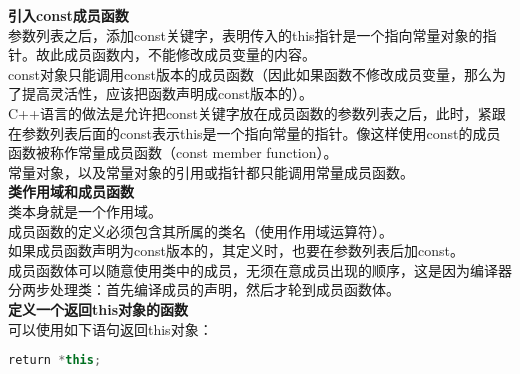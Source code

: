 \documentclass[
  a4paper,
  oneside,tablecaptionabove
]{scrbook}
\begin{document}
\textbf{引入const成员函数}\\
参数列表之后，添加const关键字，表明传入的this指针是一个指向常量对象的指针。故此成员函数内，不能修改成员变量的内容。\\
const对象只能调用const版本的成员函数（因此如果函数不修改成员变量，那么为了提高灵活性，应该把函数声明成const版本的）。\\
C++语言的做法是允许把const关键字放在成员函数的参数列表之后，此时，紧跟在参数列表后面的const表示this是一个指向常量的指针。像这样使用const的成员函数被称作常量成员函数（const
member function）。\\
常量对象，以及常量对象的引用或指针都只能调用常量成员函数。\\
\textbf{类作用域和成员函数}\\
类本身就是一个作用域。\\
成员函数的定义必须包含其所属的类名（使用作用域运算符）。\\
如果成员函数声明为const版本的，其定义时，也要在参数列表后加const。\\
成员函数体可以随意使用类中的成员，无须在意成员出现的顺序，这是因为编译器分两步处理类：首先编译成员的声明，然后才轮到成员函数体。\\
\textbf{定义一个返回this对象的函数}\\
可以使用如下语句返回this对象：

\begin{lstlisting}[language={C++}]
return *this;
\end{lstlisting}
\end{document}
